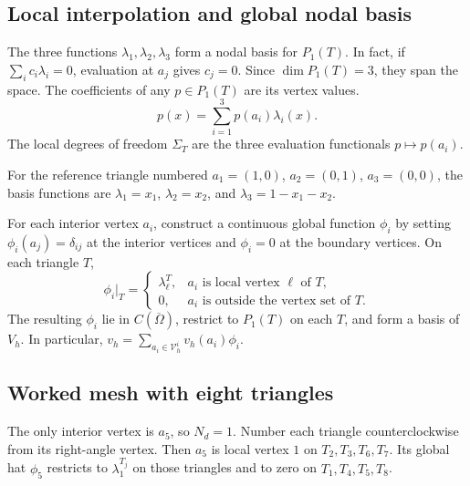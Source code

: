 \documentclass[11pt,a4paper]{article}
\begin{document}
\subsection{Local interpolation and global nodal basis}

The three functions \(\lambda_1,\lambda_2,\lambda_3\) form a nodal basis
for \(P_1(T)\). In fact, if \(\sum_i c_i\lambda_i=0\), evaluation at
\(a_j\) gives \(c_j=0\). Since \(\dim P_1(T)=3\), they span the space.
The coefficients of any \(p\in P_1(T)\) are its vertex values.
\[
 p(x)=\sum_{i=1}^3 p(a_i)\lambda_i(x).
\]
The local degrees of freedom \(\Sigma_T\) are the three evaluation
functionals \(p\mapsto p(a_i)\).

For the reference triangle numbered \(a_1=(1,0)\), \(a_2=(0,1)\),
\(a_3=(0,0)\), the basis functions are
\(\lambda_1=x_1\), \(\lambda_2=x_2\), and
\(\lambda_3=1-x_1-x_2\).

For each interior vertex \(a_i\), construct a continuous global function
\(\phi_i\) by setting \(\phi_i(a_j)=\delta_{ij}\) at the interior vertices
and \(\phi_i=0\) at the boundary vertices. On each triangle \(T\),
\[
 \phi_i|_T=
 \begin{cases}
  \lambda_\ell^T, & a_i\text{ is local vertex }\ell\text{ of }T,\\
  0, & a_i\text{ is outside the vertex set of }T .
 \end{cases}
\]
The resulting \(\phi_i\) lie in \(C(\overline\Omega)\), restrict to
\(P_1(T)\) on each \(T\), and form a basis of \(V_h\). In particular,
\(v_h=\sum_{a_i\in\mathcal V_h^i} v_h(a_i)\phi_i\).

\subsection{Worked mesh with eight triangles}

\noindent\begin{minipage}[c]{0.65\linewidth}

The only interior vertex is \(a_5\), so \(N_d=1\). Number each
triangle counterclockwise from its right-angle vertex. Then \(a_5\)
is local vertex \(1\) on \(T_2,T_3,T_6,T_7\). Its global hat
\(\phi_5\) restricts to \(\lambda_1^{T_j}\) on those triangles and
to zero on \(T_1,T_4,T_5,T_8\).

\end{minipage}\hfill
\begin{minipage}[c]{0.32\linewidth}\centering
\end{minipage}
\end{document}
